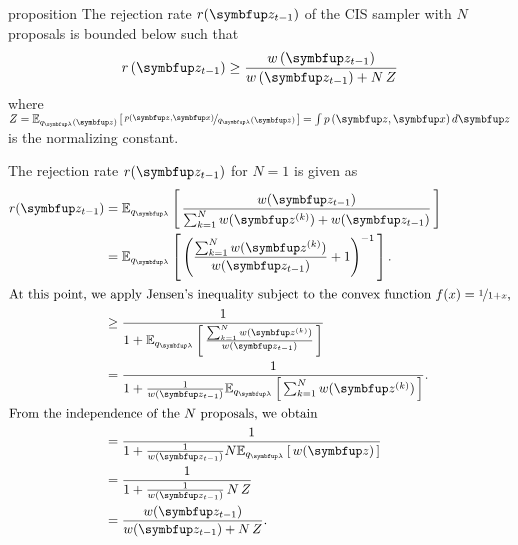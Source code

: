
\begin{theoremEnd}[]{proposition}\label{thm:cis_bound}
  The rejection rate \(r(\vz_{t-1})\) of the CIS sampler with \(N\) proposals is bounded below such that
  \[
  r\,(\vz_{t-1}) \geq \frac{w\,(\vz_{t-1})}{w\,(\vz_{t-1}) + N\,Z}
  \]
  where \(Z=\Esub{q_{\vlambda}(\vz)}{\nicefrac{p(\vz,\vx)}{q_{\vlambda}(\vz)}} = \int p\,(\vz,\vx)\,d\vz\) is the normalizing constant.
\end{theoremEnd}
\begin{proofEnd}
  The rejection rate \(r(\vz_{t-1})\) for \(N=1\) is given as
  \begin{align}
    r(\vz_{t-1})
    &= \Esub{q_{\vlambda}}{ \frac{w(\vz_{t-1})}{ \sum^{N}_{k=1} w(\vz^{(k)}) + w(\vz_{t-1})} } \\
    &= \Esub{q_{\vlambda}}{ {\left( \frac{\sum^{N}_{k=1} w(\vz^{(k)}) }{ w(\vz_{t-1}) } + 1 \right)}^{-1} }.  \\
\intertext{At this point, we apply Jensen's inequality subject to the convex function \(f(x) = \nicefrac{1}{1 + x}\),}
    &\geq \frac{1}{1 + \Esub{q_{\vlambda}}{ \frac{\sum^{N}_{k=1} w(\vz^{(k)})}{w(\vz_{t-1})} } } \\
    &=    \frac{1}{1 + \frac{1}{w(\vz_{t-1})} \Esub{q_{\vlambda}}{ \sum^{N}_{k=1} w(\vz^{(k)}) } }. \\
\intertext{From the independence of the \(N\) proposals, we obtain}
    &=    \frac{1}{1 + \frac{1}{w(\vz_{t-1})} N \Esub{q_{\vlambda}}{ w(\vz) } } \\
    &=    \frac{1}{1 + \frac{1}{w(\vz_{t-1})}\,N\,Z } \\
    &=    \frac{w(\vz_{t-1})}{w(\vz_{t-1}) + N\,Z}. \\
  \end{align}
\end{proofEnd}


